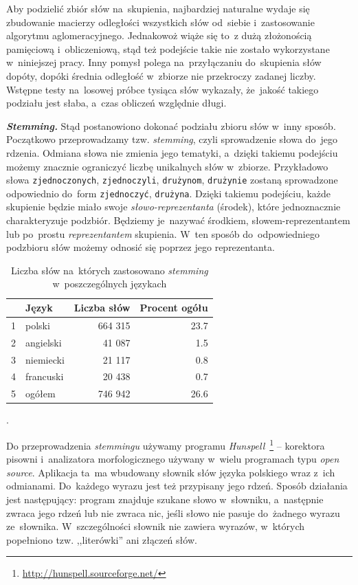 \documentclass{praca1}
\begin{document}
Aby podzielić zbiór słów na~skupienia, najbardziej naturalne wydaje się zbudowanie macierzy odległości wszystkich słów od~siebie i~zastosowanie algorytmu aglomeracyjnego. Jednakowoż wiąże się to~z dużą złożonością pamięciową i~obliczeniową, stąd też podejście takie nie zostało wykorzystane w~niniejszej pracy. Inny pomysł polega na~przyłączaniu do~skupienia słów dopóty, dopóki średnia odległość w~zbiorze nie przekroczy zadanej liczby. Wstępne testy na~losowej próbce tysiąca słów wykazały, że~jakość takiego podziału jest słaba, a~czas obliczeń względnie długi.

\emph{\textbf{Stemming.}}
Stąd postanowiono dokonać podziału zbioru słów w~inny sposób. Początkowo przeprowadzamy tzw. \emph{stemming}, czyli sprowadzenie słowa do~jego rdzenia. Odmiana słowa nie zmienia jego tematyki, a~dzięki takiemu podejściu możemy znacznie ograniczyć liczbę unikalnych słów w~zbiorze. Przykładowo słowa \verb|zjednoczonych|, \verb|zjednoczyli|, \verb|drużynom|, \verb|drużynie| zostaną sprowadzone odpowiednio do~form \verb|zjednoczyć|, \verb|drużyna|. Dzięki takiemu podejściu, każde skupienie będzie miało swoje \emph{słowo-reprezentanta} (środek), które jednoznacznie charakteryzuje podzbiór. Będziemy je~nazywać środkiem, słowem-reprezentantem lub po~prostu \emph{reprezentantem} skupienia. W~ten sposób do~odpowiedniego podzbioru słów możemy odnosić się poprzez jego reprezentanta.

\begin{table}[!h]
\centering
\begin{tabular}{|rl|rr|}
  \hline
 & Język & Liczba słów & Procent ogółu\\ 
  \hline
1 & polski & 664 315 & 23.7 \\ 
  2 & angielski & 41 087 & 1.5 \\ 
  3 & niemiecki & 21 117 & 0.8 \\ 
  4 & francuski & 20 438 & 0.7 \\ \hline
  5 & ogółem & 746 942 & 26.6 \\ 
   \hline
\end{tabular}
\caption{Liczba słów na~których zastosowano \emph{stemming} w~poszczególnych językach}.
\label{tab:002}
\end{table}

Do przeprowadzenia \emph{stemmingu} używamy programu \emph{Hunspell}~\footnote{\url{http://hunspell.sourceforge.net/}} -- korektora pisowni i~analizatora morfologicznego używany w~wielu programach typu \emph{open source}. Aplikacja ta~ma wbudowany słownik słów języka polskiego wraz z~ich odmianami. Do~każdego wyrazu jest też przypisany jego rdzeń. Sposób działania jest następujący: program znajduje szukane słowo w~słowniku, a~następnie zwraca jego rdzeń lub nie zwraca nic, jeśli słowo nie pasuje do~żadnego wyrazu ze~słownika. W~szczególności słownik nie zawiera wyrazów, w~których popełniono tzw. ,,literówki'' ani złączeń słów.
\end{document}
